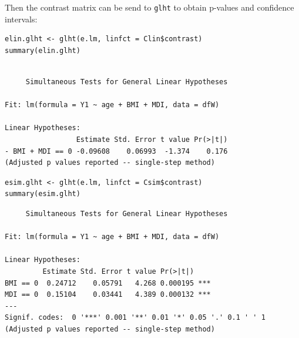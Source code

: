 \documentclass{article}
\begin{document}
Then the contrast matrix can be send to \texttt{glht} to obtain p-values and
confidence intervals:
\lstset{language=r,label= ,caption= ,captionpos=b,numbers=none}
\begin{lstlisting}
elin.glht <- glht(e.lm, linfct = Clin$contrast)
summary(elin.glht)
\end{lstlisting}

\begin{verbatim}

	 Simultaneous Tests for General Linear Hypotheses

Fit: lm(formula = Y1 ~ age + BMI + MDI, data = dfW)

Linear Hypotheses:
                 Estimate Std. Error t value Pr(>|t|)
- BMI + MDI == 0 -0.09608    0.06993  -1.374    0.176
(Adjusted p values reported -- single-step method)
\end{verbatim}

\lstset{language=r,label= ,caption= ,captionpos=b,numbers=none}
\begin{lstlisting}
esim.glht <- glht(e.lm, linfct = Csim$contrast)
summary(esim.glht)
\end{lstlisting}

\begin{verbatim}
	 Simultaneous Tests for General Linear Hypotheses

Fit: lm(formula = Y1 ~ age + BMI + MDI, data = dfW)

Linear Hypotheses:
         Estimate Std. Error t value Pr(>|t|)    
BMI == 0  0.24712    0.05791   4.268 0.000195 ***
MDI == 0  0.15104    0.03441   4.389 0.000132 ***
---
Signif. codes:  0 '***' 0.001 '**' 0.01 '*' 0.05 '.' 0.1 ' ' 1
(Adjusted p values reported -- single-step method)
\end{verbatim}
\end{document}

